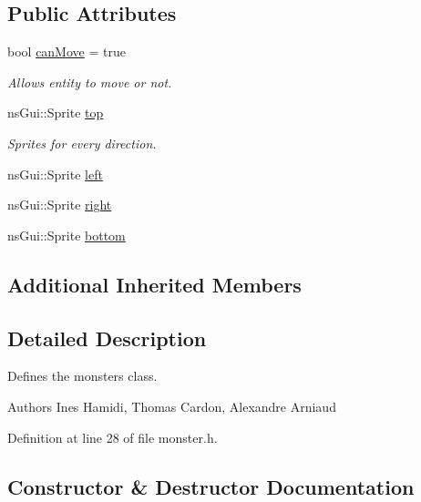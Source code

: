 \subsection*{Public Attributes}
\begin{DoxyCompactItemize}
\item 
bool \hyperlink{classns_game_1_1_monster_ab3290fa9f51e0fcbeff313cd6c8fec7e}{can\+Move} = true
\begin{DoxyCompactList}\small\item\em Allows entity to move or not. \end{DoxyCompactList}\item 
ns\+Gui\+::\+Sprite \hyperlink{classns_game_1_1_monster_ad20c897b4b4042a27ad2eefeead5ea47}{top}
\begin{DoxyCompactList}\small\item\em Sprites for every direction. \end{DoxyCompactList}\item 
ns\+Gui\+::\+Sprite \hyperlink{classns_game_1_1_monster_abce2dcb5accc85533cb9176a913d8d5c}{left}
\item 
ns\+Gui\+::\+Sprite \hyperlink{classns_game_1_1_monster_a32a00b717e96ccc6008b978d048802d6}{right}
\item 
ns\+Gui\+::\+Sprite \hyperlink{classns_game_1_1_monster_a1ce7159819ef30be7f9efed781f7ce49}{bottom}
\end{DoxyCompactItemize}
\subsection*{Additional Inherited Members}


\subsection{Detailed Description}
Defines the monsters class. 

\begin{DoxyAuthor}{Authors}
Ines Hamidi, Thomas Cardon, Alexandre Arniaud 
\end{DoxyAuthor}


Definition at line 28 of file monster.\+h.



\subsection{Constructor \& Destructor Documentation}
\mbox{\label{classns_game_1_1_monster_a93d359ec069d9667352b54e3b531b4e3}} 
